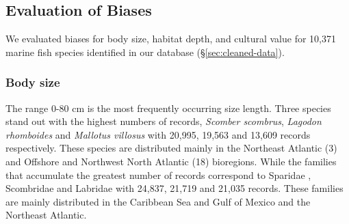 \documentclass[12pt,authoryear]{elsarticle}
\providecommand{\DIFaddbegin}{} %
\providecommand{\DIFaddend}{} %
\begin{document}
\DIFaddbegin 


\DIFaddend \subsection{Evaluation of Biases}

We evaluated biases for body size, habitat depth, and cultural value for 10,371 marine fish species identified in our database (\S \ref{sec:cleaned-data}).

\subsubsection{Body size}
The range 0-80 cm is the most frequently occurring size length. Three species stand out with the highest numbers of records, \textit{Scomber scombrus}, \textit{Lagodon rhomboides} and \textit{Mallotus villosus}  with 20,995, 19,563 and 13,609 records respectively. These species are distributed mainly in the Northeast Atlantic (3) and Offshore and Northwest North Atlantic (18) bioregions. While the families that accumulate the greatest number of records correspond to Sparidae , Scombridae and Labridae with 24,837, 21,719 and 21,035 records. These families are mainly distributed in the Caribbean Sea and Gulf of Mexico and the Northeast Atlantic.  
\end{document}
